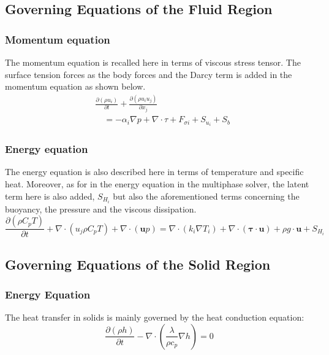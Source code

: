 \subsection{Governing Equations of the Fluid Region}
\subsubsection*{Momentum equation}
The momentum equation is recalled here in terms of viscous stress tensor. The surface tension forces as the body forces and the Darcy term is added in the momentum equation as shown below.
\begin{equation}
	\label{4.4}
	\begin{aligned}
	&\frac{\partial\left(\rho {u}_{i}\right)}{\partial t}+\frac{\partial\left(\rho {u}_{i} {u}_{j}\right)}{\partial x_{j}} \\
	&\quad=-\alpha_{i} \nabla p+\nabla \cdot \tau +F_{\sigma i}+S_{u_{i}}+S_{b}
	\end{aligned}
\end{equation}
\subsubsection*{Energy equation}
The energy equation is also described here in terms of temperature and specific heat. Moreover, as for in the energy equation in the multiphase solver, the latent term here is also added, $S_{H_{i}}$ but also the aforementioned terms concerning the buoyancy, the pressure and the viscous dissipation.
\begin{equation}
	\label{4.5}
	\frac{\partial (\rho C_{p} T)}{\partial t}+\nabla \cdot\left(u_{j}\rho C_{p} T\right) + \nabla \cdot (\textbf{u}p)=\nabla \cdot\left(k_{i} \nabla T_{i}\right) + \nabla \cdot (\boldsymbol{\tau}\cdot\textbf{u})+\rho g \cdot \textbf{u} + S_{H_{i}}
\end{equation}
\subsection{Governing Equations of the Solid Region}
\subsubsection{Energy Equation}
The heat transfer in solids is mainly governed by the heat conduction equation:
\begin{equation}
	\frac{\partial (\rho h)}{\partial t} - \nabla \cdot\left(\frac{\lambda}{\rho c_{p}} \nabla h\right)=0
	\label{4.6}
\end{equation}
\clearpage

